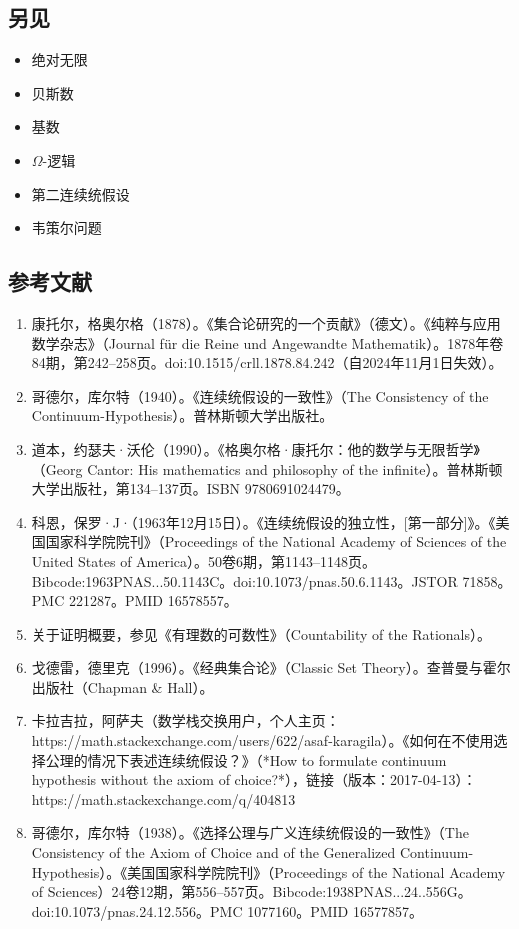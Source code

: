 \subsection{另见}  
\begin{itemize}
\item 绝对无限  
\item 贝斯数  
\item 基数  
\item \( \Omega \)-逻辑  
\item 第二连续统假设  
\item 韦策尔问题
\end{itemize}
\subsection{参考文献}
\begin{enumerate}
\item 康托尔，格奥尔格（1878）。《集合论研究的一个贡献》（德文）。《纯粹与应用数学杂志》（Journal für die Reine und Angewandte Mathematik）。1878年卷84期，第242–258页。doi:10.1515/crll.1878.84.242（自2024年11月1日失效）。
\item 哥德尔，库尔特（1940）。《连续统假设的一致性》（The Consistency of the Continuum-Hypothesis）。普林斯顿大学出版社。
\item 道本，约瑟夫·沃伦（1990）。《格奥尔格·康托尔：他的数学与无限哲学》（Georg Cantor: His mathematics and philosophy of the infinite）。普林斯顿大学出版社，第134–137页。ISBN 9780691024479。
\item 科恩，保罗·J·（1963年12月15日）。《连续统假设的独立性，[第一部分]》。《美国国家科学院院刊》（Proceedings of the National Academy of Sciences of the United States of America）。50卷6期，第1143–1148页。Bibcode:1963PNAS...50.1143C。doi:10.1073/pnas.50.6.1143。JSTOR 71858。PMC 221287。PMID 16578557。
\item 关于证明概要，参见《有理数的可数性》（Countability of the Rationals）。
\item 戈德雷，德里克（1996）。《经典集合论》（Classic Set Theory）。查普曼与霍尔出版社（Chapman & Hall）。
\item 卡拉吉拉，阿萨夫（数学栈交换用户，个人主页：https://math.stackexchange.com/users/622/asaf-karagila）。《如何在不使用选择公理的情况下表述连续统假设？》（*How to formulate continuum hypothesis without the axiom of choice?*），链接（版本：2017-04-13）：https://math.stackexchange.com/q/404813
\item 哥德尔，库尔特（1938）。《选择公理与广义连续统假设的一致性》（The Consistency of the Axiom of Choice and of the Generalized Continuum-Hypothesis）。《美国国家科学院院刊》（Proceedings of the National Academy of Sciences）24卷12期，第556–557页。Bibcode:1938PNAS...24..556G。doi:10.1073/pnas.24.12.556。PMC 1077160。PMID 16577857。

\end{enumerate}
